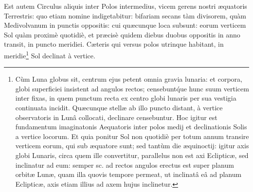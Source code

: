 \documentclass[a4paper, 11pt, oneside, polutonikogreek, german]{article}
\begin{document}
Est autem Circulus aliquis inter Polos intermedius, vicem gerens nostri æquatoris Terrestris: quo etiam nomine indigetabitur: bifariam secans tàm divisorem, quàm Medivolvanum in punctis oppositis: cui quæcunque loca subsunt: eorum verticem Sol quàm proximè quotidiè, et præcisè quidem diebus duobus oppositis in anno transit, in puncto meridiei. Cæteris qui versus polos utrinque habitant, in meridie\footnote{Cùm Luna globus sit, centrum ejus petent omnia gravia lunaria: et corpora, globi superficiei insistent ad angulos rectos; censebunt\'que hunc suum verticem inter fixas, in quem punctum recta ex centro globi lunaris per sua vestigia continuata incidit. Quæcunque stellæ ab illo puncto distant, à vertice observatoris in Lunâ collocati, declinare censebuntur. Hoc igitur est fundamentum imaginatonis Aequatoris inter polos medij et declinationis Solis a vertice locorum. Et quia ponitur Sol non quotidiè per totum annum transire verticem eorum, qui sub æquatore sunt; sed tantùm die æquinoctij: igitur axis globi Lunaris, circa quem ille convertitur, parallelus non est axi Eclipticæ, sed inclinatur ad eum: semper sc. ad rectos angulos erectus est super planum orbitæ Lunæ, quam illa quovis tempore permeat, ut inclinatâ eâ ad planum Eclipticæ, axis etiam illius ad axem hujus inclinetur.} Sol declinat à vertice.
\end{document}
